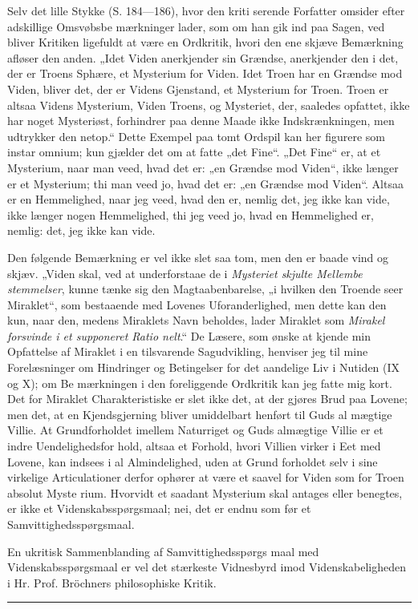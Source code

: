 \documentclass[12pt]{book}
\newcommand{\opage}[1]{\marginnote{\footnotesize\textit{[#1]}}}
\begin{document}
\opage{51}\setcounter{footnote}{0}%
Selv det lille Stykke (S. 184---186), hvor den kriti\-%
serende Forfatter omsider efter adskillige Omsvøbsbe\-%
mærkninger lader, som om han gik ind paa Sagen, ved\-%
bliver Kritiken ligefuldt at være en Ordkritik, hvori den
ene skjæve Bemærkning afløser den anden. „Idet Viden
anerkjender sin Grændse, anerkjender den i det, der er
Troens Sphære, et Mysterium for Viden. Idet Troen
har en Grændse mod Viden, bliver det, der er Videns
Gjenstand, et Mysterium for Troen. Troen er altsaa
Videns Mysterium, Viden Troens, og Mysteriet, der,
saaledes opfattet, ikke har noget Mysteriøst, forhindrer
paa denne Maade ikke Indskrænkningen, men udtrykker
den netop.“ Dette Exempel paa tomt Ordspil kan her
figurere som instar omnium; kun gjælder det om at
fatte „det Fine“. „Det Fine“ er, at et Mysterium, naar
man veed, hvad det er: „en Grændse mod Viden“, ikke
længer er et Mysterium; thi man veed jo, hvad det er: „en
Grændse mod Viden“. Altsaa er en Hemmelighed, naar
jeg veed, hvad den er, nemlig det, jeg ikke kan vide,
ikke længer nogen Hemmelighed, thi jeg veed jo, hvad
en Hemmelighed er, nemlig: det, jeg ikke kan vide.

Den følgende Bemærkning er vel ikke slet saa tom,
men den er baade vind og skjæv. „Viden skal, ved
at underforstaae de i \emph{Mysteriet skjulte Mellembe\-%
stemmelser}, kunne tænke sig den Magtaabenbarelse,
„i hvilken den Troende seer Miraklet“, som bestaaende
med Lovenes Uforanderlighed, men dette kan den kun,
\opage{52}\setcounter{footnote}{0}%
naar den, medens Miraklets Navn beholdes, lader Miraklet
som \emph{Mirakel forsvinde i et supponeret Ratio\-%
nelt}.“ De Læsere, som ønske at kjende min Opfattelse
af Miraklet i en tilsvarende Sagudvikling, henviser jeg
til mine Forelæsninger om Hindringer og Betingelser
for det aandelige Liv i Nutiden (IX og X); om Be\-%
mærkningen i den foreliggende Ordkritik kan jeg fatte
mig kort. Det for Miraklet Charakteristiske er slet ikke
det, at der gjøres Brud paa Lovene; men det, at en
Kjendsgjerning bliver umiddelbart henført til Guds al\-%
mægtige Villie. At Grundforholdet imellem Naturriget
og Guds almægtige Villie er et indre Uendelighedsfor\-%
hold, altsaa et Forhold, hvori Villien virker i Eet med
Lovene, kan indsees i al Almindelighed, uden at Grund\-%
forholdet selv i sine virkelige Articulationer derfor ophører
at være et saavel for Viden som for Troen absolut Myste\-%
rium. Hvorvidt et saadant Mysterium skal antages eller
benegtes, er ikke et Videnskabsspørgsmaal; nei, det er
endnu som før et Samvittighedsspørgsmaal.

En ukritisk Sammenblanding af Samvittighedsspørgs\-%
maal med Videnskabsspørgsmaal er vel det stærkeste
Vidnesbyrd imod Videnskabeligheden i Hr. Prof. Bröchners
philosophiske Kritik.

\begin{center}\rule{3cm}{0.4pt}\end{center}
\end{document}
